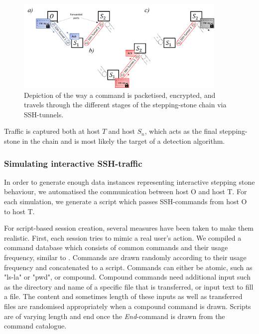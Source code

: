 \documentclass[runningheads]{llncs}\usepackage[]{graphicx}\usepackage[]{color}
\begin{document}
\begin{figure}
\centering
\includegraphics[width=0.9\textwidth]{images/Packetway.png}
\caption{Depiction of the way a command is packetised, encrypted, and travels through the different stages of the stepping-stone chain via SSH-tunnels.}\label{Fig:Packetway}
\end{figure}

Traffic is captured both at host $T$ and host $S_n$, which acts as the final stepping-stone in the chain and is most likely the target of a detection algorithm. 








\subsubsection{Simulating interactive SSH-traffic}\label{Sec:Simulating_interactive}

In order to generate enough data instances representing interactive stepping stone behaviour, we automatised the communication between host O and host T.  For each simulation, we generate a script which passes SSH-commands from host O to host T.

For script-based session creation, several measures have been taken to make them realistic. First, each session tries to mimic a real user's action. We compiled a command database which consists of common commands and their usage frequency, similar to \cite{xin2006testbed}.%
Commands are drawn randomly according to their usage frequency and concatenated to a script. 
Commands can either be atomic, such as "ls-la" or "pwd", or compound. Compound commands need additional input such as the directory and name of a specific file that is transferred, or input text to fill a file. The content and sometimes length of these inputs as well as transferred files are randomised appropriately when a compound command is drawn. Scripts are of varying length and end once the \textit{End}-command is drawn from the command catalogue. 
\end{document}
